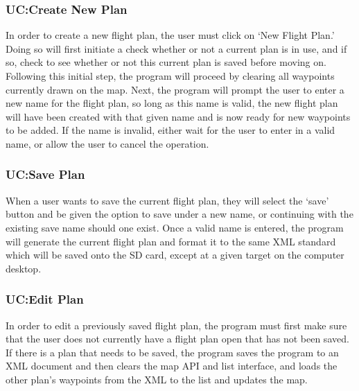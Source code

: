 \documentclass[12pt, letterpaper]{article}
\begin{document}
\clearpage
\subsubsection{UC:Create New Plan}\label{newplan}
In order to create a new flight plan, the user must click on `New Flight Plan.'
Doing so will first initiate a check whether or not a current plan is in use, and if so, check to see whether or not this current plan is saved before moving on.
Following this initial step, the program will proceed by clearing all waypoints currently drawn on the map.
Next, the program will prompt the user to enter a new name for the flight plan, so long as this name is valid, the new flight plan will have been created with that given name and is now ready for new waypoints to be added.
If the name is invalid, either wait for the user to enter in a valid name, or allow the user to cancel the operation.

\clearpage
\subsubsection{UC:Save Plan} \label{saveplan}
When a user wants to save the current flight plan, they will select the `save' button and be given the option to save under a new name, or continuing with the existing save name should one exist.
Once a valid name is entered, the program will generate the current flight plan and format it to the same XML standard which will be saved onto the SD card, except at a given target on the computer desktop.

\clearpage
\subsubsection{UC:Edit Plan} \label{editplan}
In order to edit a previously saved flight plan, the program must first make sure that the user does not currently have a flight plan open that has not been saved.
If there is a plan that needs to be saved, the program saves the program to an XML document and then clears the map API and list interface, and loads the other plan’s waypoints from the XML to the list and updates the map.

\clearpage
\end{document}
